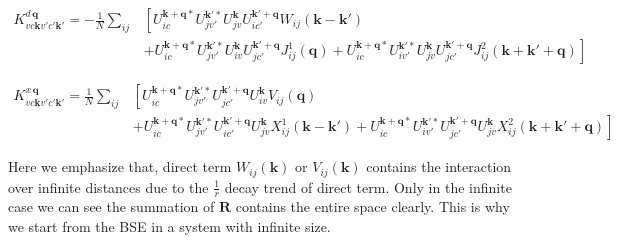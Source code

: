 \begin{equation}
  \begin{aligned}
    K_{vc\boldsymbol{k}v'c'\boldsymbol{k}'}^{d \, \boldsymbol{q}} = - \frac{1}{N}\sum_{ij}
      &\left[ U_{ic}^{\boldsymbol{k}+\boldsymbol{q}*} U_{jv'}^{\boldsymbol{k}'*} 
              U_{jv}^{\boldsymbol{k}} U_{ic'}^{\boldsymbol{k}'+\boldsymbol{q}} 
              W_{ij}(\boldsymbol{k}-\boldsymbol{k}') \right. \\
      &\left. + U_{ic}^{\boldsymbol{k}+\boldsymbol{q}*} U_{jv'}^{\boldsymbol{k}'*} 
                U_{iv}^{\boldsymbol{k}} U_{jc'}^{\boldsymbol{k}'+\boldsymbol{q}} 
                J_{ij}^{1}(\boldsymbol{q}) 
              + U_{ic}^{\boldsymbol{k}+\boldsymbol{q}*} U_{iv'}^{\boldsymbol{k}'*} 
                U_{jv}^{\boldsymbol{k}} U_{jc'}^{\boldsymbol{k}'+\boldsymbol{q}} 
                J_{ij}^{2}(\boldsymbol{k}+\boldsymbol{k}'+\boldsymbol{q}) 
      \right]
  \end{aligned}
\end{equation}

\begin{equation}
  \begin{aligned}
    K_{vc\boldsymbol{k}v'c'\boldsymbol{k}'}^{x \, \boldsymbol{q}} = \frac{1}{N}\sum_{ij}
      &\left[ U_{ic}^{\boldsymbol{k}+\boldsymbol{q}*} U_{jv'}^{\boldsymbol{k}'*} 
              U_{jc'}^{\boldsymbol{k}'+\boldsymbol{q}} U_{iv}^{\boldsymbol{k}} 
              V_{ij}(\boldsymbol{q}) \right. \\
      &\left. + U_{ic}^{\boldsymbol{k}+\boldsymbol{q}*} U_{jv'}^{\boldsymbol{k}'*} 
                U_{ic'}^{\boldsymbol{k}'+\boldsymbol{q}} U_{jv}^{\boldsymbol{k}} 
                X_{ij}^{1}(\boldsymbol{k}-\boldsymbol{k}') 
              + U_{ic}^{\boldsymbol{k}+\boldsymbol{q}*} U_{iv'}^{\boldsymbol{k}'*} 
                U_{jc'}^{\boldsymbol{k}'+\boldsymbol{q}} U_{jv}^{\boldsymbol{k}} 
                X_{ij}^{2}(\boldsymbol{k}+\boldsymbol{k}'+\boldsymbol{q}) 
      \right]
  \end{aligned}
\end{equation}

Here we emphasize that, direct term $W_{ij}(\boldsymbol{k})$ or $V_{ij}(\boldsymbol{k})$ contains the interaction over infinite distances
due to the $\frac{1}{r}$ decay trend of direct term.
Only in the infinite case we can see the summation of $\boldsymbol{R}$ contains the entire space clearly.
This is why we start from the BSE in a system with infinite size.



